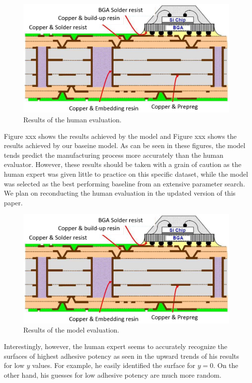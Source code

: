 \documentclass[10pt,twocolumn,letterpaper]{article}
\begin{document}
\begin{figure}[h]
	\centering
	\includegraphics[width=0.9\linewidth]{"./figures/Figure1"}
	\caption{
		Results of the human evaluation.
	}
\end{figure}

Figure xxx shows the results achieved by the model and Figure xxx shows the results achieved by our baseine model.
As can be seen in these figures, the model tends predict the manufacturing 
process more accurately than the human evaluator.
However, these results should be taken with a grain of caution 
as the human expert was given little to practice on this specific dataset,
while the model was selected as the best performing baseline from an extensive parameter search.
We plan on reconducting the human evaluation in the updated version of this paper.

\begin{figure}[h]
	\centering
	\includegraphics[width=0.9\linewidth]{"./figures/Figure1"}
	\caption{
		Results of the model evaluation.
	}
\end{figure}

Interestingly, however, the human expert seems to accurately recognize 
the surfaces of highest adhesive potency as seen in the upward trends of his results 
for low $y$ values. For example, he easily identified the surface for $y=0$.
On the other hand, his guesses for low adhesive potency are much more random.
\end{document}
